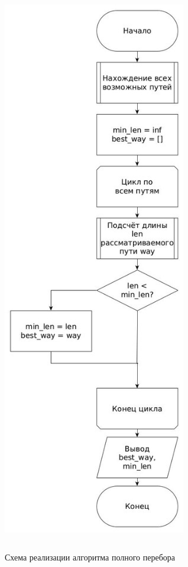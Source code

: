 \FloatBarrier
\begin{figure}[hp]
	\begin{center}
		\includegraphics[width=8cm, height=25cm]{graph/full.jpg}
	\end{center}
	\caption{Схема реализации алгоритма полного перебора}
\end{figure}
\FloatBarrier

